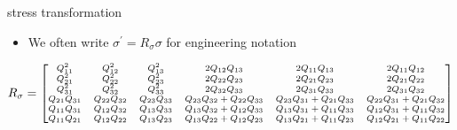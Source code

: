 \documentclass[
  letterpaper,
  ignorenonframetext,
  aspectratio=43,
  handout,
  12pt]{beamer}
\providecommand{\tightlist}{%
  \setlength{\itemsep}{0pt}\setlength{\parskip}{0pt}}
\providecommand{\tightlist}{%
\setlength{\itemsep}{0pt}\setlength{\parskip}{0pt}}
\begin{document}
\begin{frame}{stress transformation}
\protect\hypertarget{stress-transformation-2}{}
\begin{itemize}
\tightlist
\item
  We often write \(\sigma^\prime =R_\sigma \sigma\) for engineering
  notation
\end{itemize}

\[\scriptsize{R_\sigma = \begin{bmatrix}
      Q_{11}^2 & Q_{12}^2 & Q_{13}^2 & 2Q_{12}Q_{13} & 2 Q_{11} Q_{13} & 2Q_{11}Q_{12}\\
      Q_{21}^2 & Q_{22}^2 & Q_{23}^2 & 2Q_{22}Q_{23} & 2 Q_{21} Q_{23} & 2Q_{21}Q_{22}\\
      Q_{31}^2 & Q_{32}^2 & Q_{33}^2 & 2Q_{32}Q_{33} & 2 Q_{31} Q_{33} & 2Q_{31}Q_{32}\\
      Q_{21}Q_{31} & Q_{22}Q_{32} & Q_{23}Q_{33} & Q_{23}Q_{32} + Q_{22}Q_{33} & Q_{23}Q_{31} + Q_{21}Q_{33} & Q_{22}Q_{31} + Q_{21}Q_{32}\\
      Q_{11}Q_{31} & Q_{12}Q_{32} & Q_{13}Q_{33} & Q_{13}Q_{32} + Q_{12}Q_{33} & Q_{13}Q_{31} + Q_{11}Q_{33} & Q_{12}Q_{31} + Q_{11}Q_{32}\\
      Q_{11}Q_{21} & Q_{12}Q_{22} & Q_{13}Q_{23} & Q_{13}Q_{22} + Q_{12}Q_{23} & Q_{13}Q_{21} + Q_{11}Q_{23} & Q_{12}Q_{21} + Q_{11}Q_{22}
\end{bmatrix}}\]
\end{frame}
\end{document}
